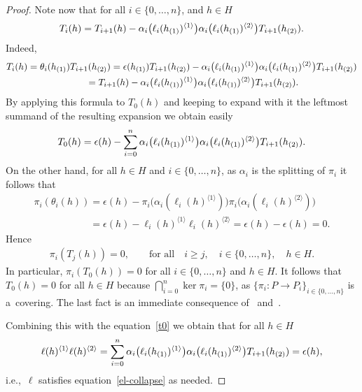 \documentclass[pdftex]{sigma}
\def\sw#1{{\sb{(#1)}}}
\newcommand{\ls}[1]{\ell(#1)^{\langle 1\rangle}}
\newcommand{\rs}[1]{\ell(#1)^{\langle 2\rangle}}
\newcommand{\lls}[2]{\ell_{#1}(#2)^{\langle 1\rangle}}
\newcommand{\rrs}[2]{\ell_{#1}(#2)^{\langle 2\rangle}}
\begin{document}
\begin{proof}
Note now that for all $i\in\{0,\ldots,n\}$, and $h\in H$
\begin{gather*}
T_i(h)=T_{i+1}(h)-\alpha_i\big(\lls{i}{h\sw{1}}\big)\alpha_i\big(\rrs{i}{h\sw{1}}\big)T_{i+1}(h\sw{2}).
\end{gather*}
Indeed,
\begin{gather*}
T_i(h) =\theta_i(h\sw{1})T_{i+1}(h\sw{2})
 ={\epsilon}(h\sw{1})T_{i+1}(h\sw{2})-\alpha_i\big(\lls{i}{h\sw{1}}\big)\alpha_i\big(\rrs{i}{h\sw{1}}\big)T_{i+1}(h\sw{2})
\\
\phantom{T_i(h)}
 =T_{i+1}(h)-\alpha_i\big(\lls{i}{h\sw{1}}\big)\alpha_i\big(\rrs{i}{h\sw{1}}\big)T_{i+1}(h\sw{2}).
\end{gather*}
By applying this formula to $T_0(h)$ and keeping to expand with it the leftmost summand of the resulting expansion we
obtain easily
\begin{gather}
\label{t0}
T_0(h)={\epsilon}(h)-\sum\limits_{i=0}^n\alpha_i\big(\lls{i}{h\sw{1}}\big)\alpha_i\big(\rrs{i}{h\sw{1}}\big)T_{i+1}(h\sw{2}).
\end{gather}
On the other hand, for all $h\in H$ and $i\in\{0,\ldots,n\}$, as $\alpha_i$ is the splitting of $\pi_i$ it follows that
\begin{gather*}
\pi_i(\theta_i(h))  ={\epsilon}(h)-\pi_i\big(\alpha_i(\lls{i}{h})\big)\pi_i\big(\alpha_i(\rrs{i}{h})\big)
\\
\phantom{\pi_i(\theta_i(h))}
={\epsilon}(h)-\lls{i}{h}\rrs{i}{h} ={\epsilon}(h)-{\epsilon}(h)
 =0.
\end{gather*}
Hence
\begin{gather*}
\pi_i(T_j(h))=0,
\qquad
\text{for all}
\quad
i\geq j,
\quad
i\in\{0,\ldots,n\},
\quad
h\in H.
\end{gather*}
In particular, $\pi_i(T_0(h))=0$ for all $i\in\{0,\ldots,n\}$ and $h\in H$.
It follows that $T_0(h)=0$ for all $h\in H$ because $\bigcap_{i=0}^n\ker\pi_i=\{0\}$, as $\{\pi_i:P\rightarrow
P_i\}_{i\in\{0,\ldots,n\}}$ is a~covering.
The last fact is an immediate consequence of~\cite[Theorem~3.3]{hkmz11} and~\cite[Corollary~3.7]{hkmz11}.

Combining this with the equation~\eqref{t0} we obtain that for all $h\in H$
\begin{gather*}
\ls{h}\rs{h}=\sum\limits_{i=0}^n\alpha_i\big(\lls{i}{h\sw{1}}\big)\alpha_i\big(\rrs{i}{h\sw{1}}\big)T_{i+1}(h\sw{2})={\epsilon}(h),
\end{gather*}
i.e.,~$\ell$ satisf\/ies equation~\eqref{el-collapse} as needed.
\end{proof}
\end{document}

